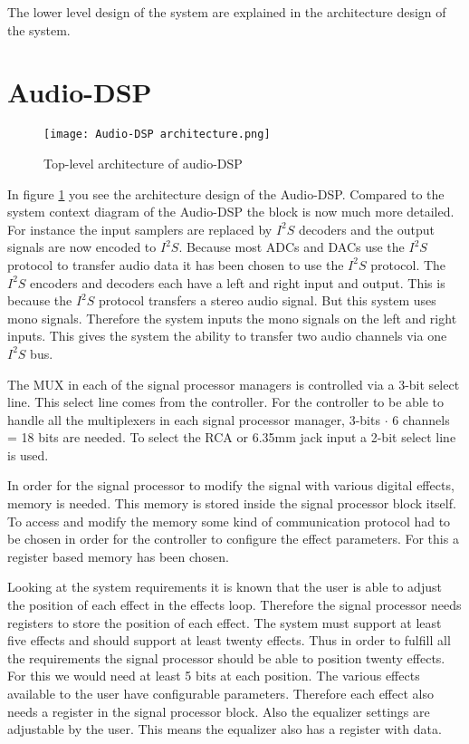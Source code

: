 The lower level design of the system are explained in the architecture design of the system. 

\section{Audio-DSP}
\begin{figure}[ht]
    \texttt{[image: Audio-DSP architecture.png]}\\    
    \caption{Top-level architecture of audio-DSP}
    \label{fig:arch-top}
\end{figure}

In figure \ref*{fig:arch-top} you see the architecture design of the Audio-DSP. Compared to the system context diagram of the Audio-DSP the block is now much more detailed. For instance the input samplers are replaced by $I^2S$ decoders and the output signals are now encoded to $I^2S$. Because most ADCs and DACs use the $I^2S$ protocol to transfer audio data it has been chosen to use the $I^2S$ protocol. The $I^2S$ encoders and decoders each have a left and right input and output. This is because the $I^2S$ protocol transfers a stereo audio signal. But this system uses mono signals. Therefore the system inputs the mono signals on the left and right inputs. This gives the system the ability to transfer two audio channels via one $I^2S$ bus.

The MUX in each of the signal processor managers is controlled via a 3-bit select line. This select line comes from the controller. For the controller to be able to handle all the multiplexers in each signal processor manager, 3-bits $\cdot$ 6 channels = 18 bits are needed. To select the RCA or 6.35mm jack input a 2-bit select line is used.

In order for the signal processor to modify the signal with various digital effects, memory is needed. This memory is stored inside the signal processor block itself. To access and modify the memory some kind of communication protocol had to be chosen in order for the controller to configure the effect parameters. For this a register based memory has been chosen.

Looking at the system requirements it is known that the user is able to adjust the position of each effect in the effects loop. Therefore the signal processor needs registers to store the position of each effect. The system must support at least five effects and should support at least twenty effects. Thus in order to fulfill all the requirements the signal processor should be able to position twenty effects. For this we would need at least 5 bits at each position. The various effects available to the user have configurable parameters. Therefore each effect also needs a register in the signal processor block. Also the equalizer settings are adjustable by the user. This means the equalizer also has a register with data.

